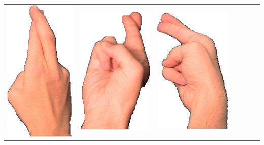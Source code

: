 \documentclass{article}
\begin{document}
\begin{center}
\begin{tabular}{r*{6}{c}}
\includegraphics[scale=0.1]{images/02-06-3.jpg}&
\includegraphics[scale=0.1]{images/02-06-4.jpg}&
\includegraphics[scale=0.1]{images/02-06-5.jpg}&

\end{tabular}
\end{center}
\end{document}
